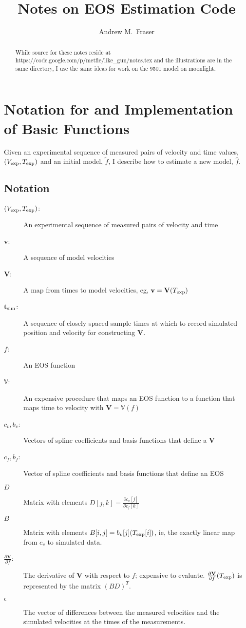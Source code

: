 \documentclass[11pt]{article}
\title{Notes on EOS Estimation Code}
\author{Andrew M.\ Fraser}
\newcommand{\fnom}{\tilde f}
\newcommand{\fhat}{\hat f}
\newcommand{\partiald}[2]{\frac{\partial #1}{\partial #2}}
\newcommand\bv{\mathbf{v}}
\newcommand\Vfunc{\mathbb{V}}
\newcommand\Vt{\mathbf{V}}
\newcommand\vexp{V_{\rm{exp}}}
\newcommand\texp{T_{\rm{exp}}}
\newcommand\cf{c_f}
\newcommand\cv{c_v}
\newcommand\fbasis{b_f}
\newcommand\vbasis{b_v}
\newcommand\tsim{{\mathbf t}_{\rm{sim}}}
\newcommand\DVDf{\partiald{\Vt}{f}}
\begin{document}
\maketitle
\begin{abstract}
  While source for these notes reside at
  https://code.google.com/p/metfie/like\_gun/notes.tex and the
  illustrations are in the same directory, I use the same ideas for
  work on the 9501 model on moonlight.
\end{abstract}

\section{Notation for and Implementation of Basic Functions}
\label{sec:basic}

Given an experimental sequence of measured pairs of velocity and time
values, $(\vexp, \texp)$ and an initial model, $\fnom$, I describe how
to estimate a new model, $\fhat$.

\subsection{Notation}
\label{sec:basic_notation}

\begin{description}
\item[$(\vexp, \texp)$:] An experimental sequence of measured pairs of
  velocity and time
\item[$\bv$:] A sequence of model velocities
\item[$\Vt$:] A map from times to model velocities, eg, $\bv =
  \Vt(\texp)$
\item[$\tsim$:] A sequence of closely spaced sample times at which to record
  simulated position and velocity for constructing $\Vt$.
\item[$f$:] An EOS function
\item[$\Vfunc$:] An expensive procedure that maps an EOS function to a
  function that maps time to velocity with $\Vt = \Vfunc(f)$
\item[$\cv,\vbasis$:] Vectors of spline coefficients and basis functions
  that define a $\Vt$
\item[$\cf,\fbasis$:] Vector of spline coefficients and basis functions
  that define an EOS
\item[$D$] Matrix with elements $D[j,k] = \partiald{\cv[j]}{\cf[k]}$
\item[$B$] Matrix with elements $B[i,j] = \vbasis[j](\texp[i])$, ie,
  the exactly linear map from $c_v$ to simulated data.
\item[$\DVDf$:] The derivative of $\Vt$ with respect to $f$; expensive
  to evaluate.  $\DVDf (\texp)$ is represented by the matrix $(BD)^T$.
\item[$\epsilon$] The vector of differences between the measured
  velocities and the simulated velocities at the times of the
  measurements.
\end{description}
\end{document}
